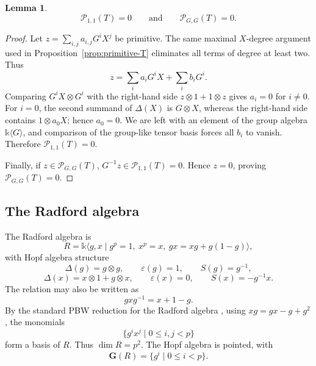 \documentclass[twoside,11pt]{amsart}
\newtheorem{lem}[defi]{Lemma}
\newcommand{\K}{\mathds{k}}
\newcommand{\G}{\mathbf{G}}
\newcommand{\Pp}{\mathcal{P}}
\begin{document}
	\begin{lem}\label{lem:P11-T}
		\[
		\Pp_{1,1}(T)=0
		\qquad\text{and}\qquad
		\Pp_{G,G}(T)=0.
		\]
	\end{lem}
	
	\begin{proof}
		Let $z=\sum_{i,j}a_{i,j}G^iX^j$ be primitive. The same maximal
		$X$-degree argument used in Proposition~\ref{prop:primitive-T} eliminates
		all terms of degree at least two. Thus
		\[
		z=\sum_i a_iG^iX+\sum_i b_iG^i.
		\]
		Comparing $G^iX\otimes G^i$ with the right-hand side
		$z\otimes1+1\otimes z$ gives $a_i=0$ for $i\ne0$. For $i=0$, the second
		summand of $\Delta(X)$ is $G\otimes X$, whereas the right-hand side contains
		$1\otimes a_0X$; hence $a_0=0$. We are left with an element of the group
		algebra $\K\langle G\rangle$, and comparison of the group-like tensor basis
		forces all $b_i$ to vanish. Therefore $\Pp_{1,1}(T)=0$.
		
		Finally, if $z\in\Pp_{G,G}(T)$, $G^{-1}z\in\Pp_{1,1}(T)=0$. Hence
		$z=0$, proving $\Pp_{G,G}(T)=0$.
	\end{proof}
	
	\subsection{The Radford algebra}
	
	The Radford algebra is
	\[
	R=\K\langle g,x\mid
	g^p=1,\ x^p=x,\ gx=xg+g(1-g)\rangle,
	\]
	with Hopf algebra structure
	\[
	\Delta(g)=g\otimes g,\qquad \varepsilon(g)=1,
	\qquad S(g)=g^{-1},
	\]
	\[
	\Delta(x)=x\otimes1+g\otimes x,\qquad
	\varepsilon(x)=0,\qquad S(x)=-g^{-1}x.
	\]
	The relation may also be written as
	\[
	gxg^{-1}=x+1-g.
	\]
	By the standard PBW reduction for the Radford algebra
	\cite{Radford77,WW14}, using $xg=gx-g+g^2$, the monomials
	\[
	\{g^ix^j\mid0\le i,j<p\}
	\]
	form a basis of $R$. Thus $\dim R=p^2$. The Hopf algebra
	is pointed, with
	\[
	\G(R)=\{g^i\mid0\le i<p\}.
	\]
	
\end{document}
